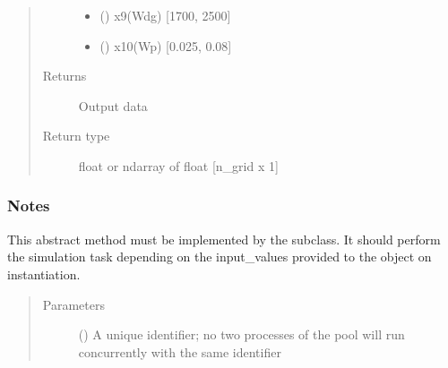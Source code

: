 \documentclass[letterpaper,10pt,english,openany,oneside]{sphinxmanual}
\begin{document}
\begin{fulllineitems}
\begin{quote}
\begin{description}
\begin{itemize}
\item {} 
\sphinxstyleliteralstrong{\sphinxupquote{{[}}}\sphinxstyleliteralstrong{\sphinxupquote{{]}}} (\sphinxstyleliteralemphasis{\sphinxupquote{ {[}}}\sphinxstyleliteralemphasis{\sphinxupquote{{]}}}) \textendash{} x9(Wdg) {[}1700, 2500{]}

\item {} 
\sphinxstyleliteralstrong{\sphinxupquote{{[}}}\sphinxstyleliteralstrong{\sphinxupquote{{]}}} (\sphinxstyleliteralemphasis{\sphinxupquote{ {[}}}\sphinxstyleliteralemphasis{\sphinxupquote{{]}}}) \textendash{} x10(Wp) {[}0.025, 0.08{]}

\end{itemize}

\item[{Returns}] \leavevmode
{} \textendash{} Output data

\item[{Return type}] \leavevmode
float or ndarray of float {[}n\_grid x 1{]}

\end{description}\end{quote}
\subsubsection*{Notes}

\begin{fulllineitems}
\label{\detokenize{pygpc.testfunctions:pygpc.testfunctions.testfunctions.WingWeight.simulate}}
This abstract method must be implemented by the subclass.
It should perform the simulation task depending on the input\_values provided to the object on instantiation.
\begin{quote}\begin{description}
\item[{Parameters}] \leavevmode
{} () \textendash{} A unique identifier; no two processes of the pool will run concurrently with the same identifier


\end{description}
\end{quote}
\end{fulllineitems}
\end{fulllineitems}
\end{document}
